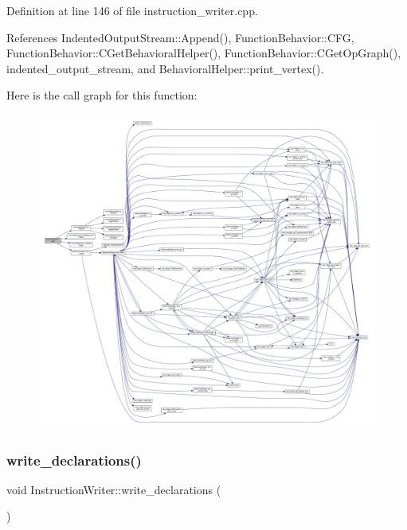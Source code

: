 Definition at line 146 of file instruction\+\_\+writer.\+cpp.



References Indented\+Output\+Stream\+::\+Append(), Function\+Behavior\+::\+C\+FG, Function\+Behavior\+::\+C\+Get\+Behavioral\+Helper(), Function\+Behavior\+::\+C\+Get\+Op\+Graph(), indented\+\_\+output\+\_\+stream, and Behavioral\+Helper\+::print\+\_\+vertex().

Here is the call graph for this function\+:
\nopagebreak
\begin{figure}[H]
\begin{center}
\leavevmode
\includegraphics[width=350pt]{d3/d00/classInstructionWriter_a94803a1043947086a0add73cb0b0213f_cgraph}
\end{center}
\end{figure}
\mbox{\label{classInstructionWriter_a94a8f1460fa6b3559ef14535feb0adab}} 
\subsubsection{\texorpdfstring{write\+\_\+declarations()}{write\_declarations()}}
{\footnotesize\ttfamily void Instruction\+Writer\+::write\+\_\+declarations (\begin{DoxyParamCaption}{ }\end{DoxyParamCaption})\hspace{0.3cm}{\ttfamily [virtual]}}



